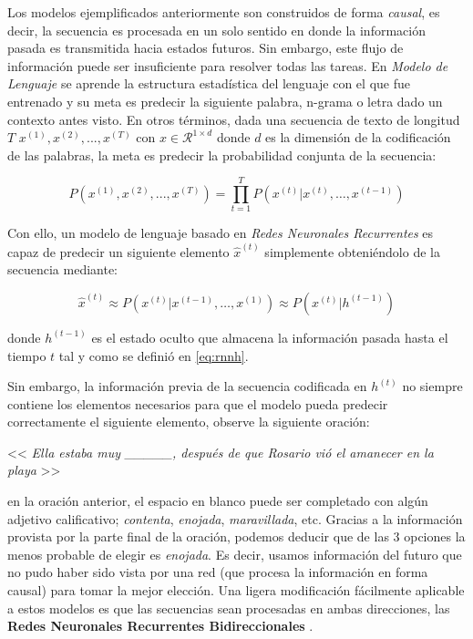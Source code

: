 Los modelos ejemplificados anteriormente son construidos de forma \textit{causal}, es
decir, la secuencia es procesada en un solo sentido en donde la información pasada es transmitida
hacia estados futuros. Sin embargo, este flujo de información puede ser insuficiente para resolver
todas las tareas. En \textit{Modelo de Lenguaje} se aprende la estructura estadística del lenguaje con el
que fue entrenado y su meta es predecir la siguiente palabra, n-grama o letra dado un contexto antes
visto. En otros términos, dada una secuencia de texto de longitud
$T$ $x^{(1)}, x^{(2)}, ..., x^{(T)}$
con $x \in \mathcal{R}^{1 \times d}$ donde $d$ es la dimensión de la codificación de las palabras,
la meta es predecir la probabilidad conjunta de la secuencia:

\begin{equation}
    P(x^{(1)}, x^{(2)}, ..., x^{(T)}) = \prod_{t=1}^{T} P(x^{(t)} | x^{(t)}, \dots , x^{(t-1)})
\end{equation}

Con ello, un modelo de lenguaje basado en \textit{Redes Neuronales Recurrentes} es capaz de predecir
un siguiente elemento $\hat x^{(t)}$ simplemente obteniéndolo de la secuencia mediante:

\begin{equation}
    \hat x^{(t)} \approx P(x^{(t)} | x^{(t-1)}, \dots, x^{(1)}) \approx P(x^{(t)} | h^{(t-1)})
\end{equation}

\noindent donde $h^{(t-1)}$ es el estado oculto que almacena la información pasada hasta el tiempo $t$
tal y como se definió en \ref{eq:rnnh}.

Sin embargo, la información previa de la secuencia codificada en $h^{(t)}$ no siempre contiene los
elementos necesarios para que el modelo pueda predecir correctamente el siguiente elemento,
observe la siguiente oración:

\begin{center}
    << \textit{Ella estaba muy \_\_\_\_\_, después de que Rosario vió el amanecer en la playa } >>
\end{center}

\noindent en la oración anterior, el espacio en blanco puede ser completado con algún adjetivo calificativo;
\textit{contenta}, \textit{enojada}, \textit{maravillada}, etc. Gracias a la información provista por
la parte final de la oración, podemos deducir que de las 3 opciones la menos probable de
elegir es \textit{enojada}. Es decir, usamos información del futuro que no pudo haber sido vista por
una red (que procesa la información en forma causal) para tomar la mejor elección. Una ligera
modificación fácilmente aplicable a estos modelos es que las secuencias sean procesadas
en ambas direcciones, las \textbf{Redes Neuronales Recurrentes Bidireccionales}
\cite{Schuster}.

